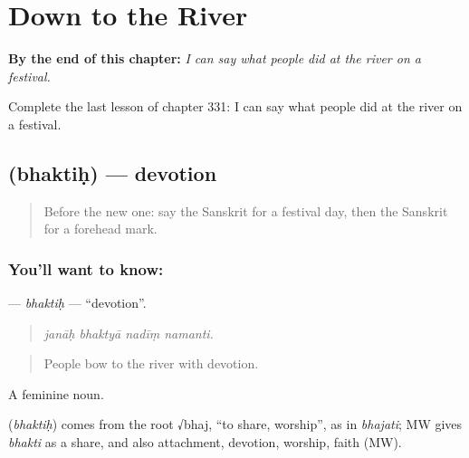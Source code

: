 
\chapter{Down to the River}
\label{ch:sa-down-to-the-river}

\begin{chapteropening}
\textbf{By the end of this chapter:} \emph{I can say what people did at the river on a festival.}

Complete the last lesson of chapter 331: I can say what people did at the river on a festival.
\end{chapteropening}

\section[\texorpdfstring{\sk{भक्तिः} (bhaktiḥ)}{भक्तिः (bhaktiḥ)}]{ (bhaktiḥ) — devotion}

\label{lesson:SA-C331-bhaktih}



\begin{quote}
Before the new one: say the Sanskrit for a festival day, then the Sanskrit for a forehead mark.
\end{quote}

\subsection*{You'll want to know: }
\textbf{} — \emph{bhaktiḥ} — \textquotedblleft{}devotion\textquotedblright{}.

\begin{quote}
   
\end{quote}

\begin{quote}
\emph{janāḥ bhaktyā nadīṃ namanti.}
\end{quote}

\begin{quote}
People bow to the river with devotion.
\end{quote}

A feminine noun.

\begin{cousinweb}
\textbf{} (\emph{bhaktiḥ}) comes from the root √bhaj, \textquotedblleft{}to share, worship\textquotedblright{}, as in \emph{bhajati}; MW gives \emph{bhakti} as a share, and also attachment, devotion, worship, faith (MW).
\end{cousinweb}

